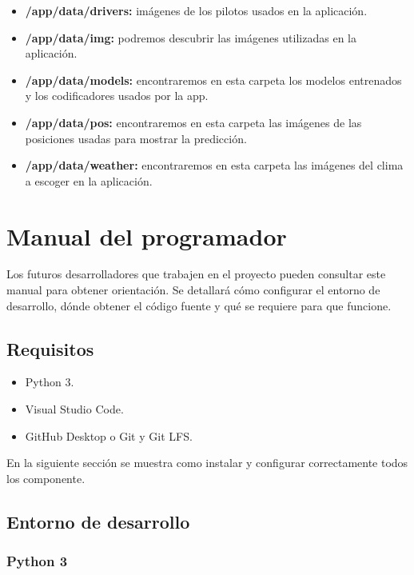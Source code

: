 \begin{itemize}
    \item \textbf{/app/data/drivers:} imágenes de los pilotos usados en la aplicación.
    \item \textbf{/app/data/img:} podremos descubrir las imágenes utilizadas en la aplicación.
    \item \textbf{/app/data/models:} encontraremos en esta carpeta los modelos entrenados y los codificadores usados por la app.
    \item \textbf{/app/data/pos:} encontraremos en esta carpeta las imágenes de las posiciones usadas para mostrar la predicción.
    \item \textbf{/app/data/weather:} encontraremos en esta carpeta las imágenes del clima a escoger en la aplicación.

\end{itemize}

\section{Manual del programador}

Los futuros desarrolladores que trabajen en el proyecto pueden consultar este manual para obtener orientación. Se detallará cómo configurar el entorno de desarrollo, dónde obtener el código fuente y qué se requiere para que funcione.

\subsection{Requisitos}

\begin{itemize}
\item
	Python 3.
\item
	Visual Studio Code.
\item
	GitHub Desktop o Git y Git LFS.
\end{itemize}

En la siguiente sección se muestra como instalar y configurar correctamente todos los componente.

\subsection{Entorno de desarrollo}

\subsubsection{Python 3}

